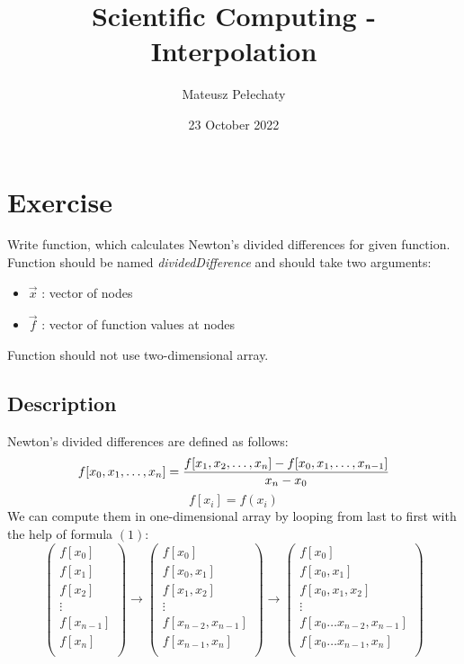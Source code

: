 \documentclass[11pt]{article}
\title{Scientific Computing - Interpolation}
\author{Mateusz Pełechaty}
\date{23 October 2022}%
\begin{document}
\maketitle

\section{Exercise}
Write function, which calculates Newton's divided differences for given function.
Function should be named \textit{dividedDifference} and should take two arguments: 
\begin{itemize}
    \item $\vec{x}$ : vector of nodes
    \item $\vec{f}$ : vector of function values at nodes
\end{itemize}
Function should not use two-dimensional array.
\subsection*{Description}
Newton's divided differences are defined as follows:
\begin{equation}
    f[x_0, x_1, \dots, x_n] = \frac{f[x_1, x_2, \dots, x_n] - f[x_0, x_1, \dots, x_{n-1}]}{x_n - x_0}\\
\end{equation}
\begin{equation*}
    f[x_i] = f(x_i)
\end{equation*}
We can compute them in one-dimensional array by looping from last to first with the help of formula $(1)$:
\begin{equation}
\begin{pmatrix}
    f[x_0] \\
    f[x_1] \\
    f[x_2] \\
    \vdots \\
    f[x_{n-1}] \\
    f[x_n] \\
\end{pmatrix}
\rightarrow
\begin{pmatrix}
    f[x_0] \\
    f[x_0,x_1] \\
    f[x_1, x_2] \\
    \vdots \\
    f[x_{n-2},x_{n-1}] \\
    f[x_{n-1}, x_n] \\
\end{pmatrix}
\rightarrow
\begin{pmatrix}
    f[x_0] \\
    f[x_0,x_1] \\
    f[x_0,x_1,x_2] \\
    \vdots \\
    f[x_0 \hdots x_{n-2},x_{n-1}] \\
    f[x_0 \hdots x_{n-1}, x_n] \\
\end{pmatrix}
\end{equation}
\end{document}
